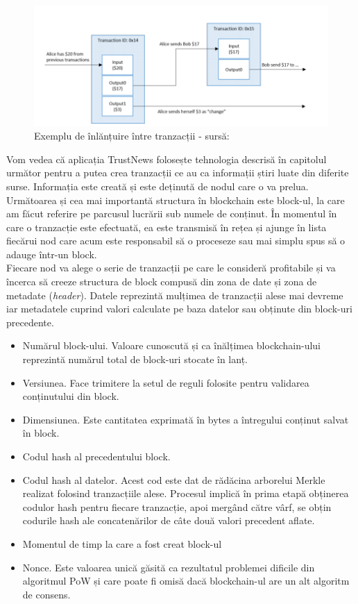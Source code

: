 \begin{figure}[H] 
\centering
\includegraphics[scale=0.575]{Images/BC_Transaction.png}
\caption{Exemplu de înlănțuire între tranzacții - sursă: \cite{Blockchain_Overview_NIST}}
\end{figure}

Vom vedea că aplicația TrustNews folosește tehnologia descrisă în capitolul următor pentru a putea crea tranzacții ce au ca informații știri luate din diferite surse. Informația este creată și este deținută de nodul care o va prelua.\\

Următoarea și cea mai importantă structura în blockchain este block-ul, la care am făcut referire pe parcusul lucrării sub numele de conținut. În momentul în care o tranzacție este efectuată, ea este transmisă în rețea și ajunge în lista fiecărui nod care acum este responsabil să o proceseze sau mai simplu spus să o adauge într-un block.\\

Fiecare nod va alege o serie de tranzacții pe care le consideră profitabile și va încerca să creeze structura de block compusă din zona de date și zona de metadate (\textit{header}). Datele reprezintă mulțimea de tranzacții alese mai devreme iar metadatele cuprind valori calculate pe baza datelor sau obținute din block-uri precedente.\\

\begin{itemize}
    \item Numărul block-ului. Valoare cunoscută și ca înălțimea blockchain-ului reprezintă numărul total de block-uri stocate în lanț.
    \item Versiunea. Face trimitere la setul de reguli folosite pentru validarea conținutului din block.
    \item Dimensiunea. Este cantitatea exprimată în bytes a întregului conținut salvat în block.
    \item Codul hash al precedentului block. 
    \item Codul hash al datelor. Acest cod este dat de rădăcina arborelui Merkle realizat folosind tranzacțiile alese.
    Procesul implică în prima etapă obținerea codulor hash pentru fiecare tranzacție, apoi mergând către vârf, se obțin codurile hash ale concatenărilor de câte două valori precedent aflate. 
    \item Momentul de timp la care a fost creat block-ul
    \item Nonce. Este valoarea unică găsită ca rezultatul problemei dificile din algoritmul PoW și care poate fi omisă dacă blockchain-ul are un alt algoritm de consens.
\end{itemize}

